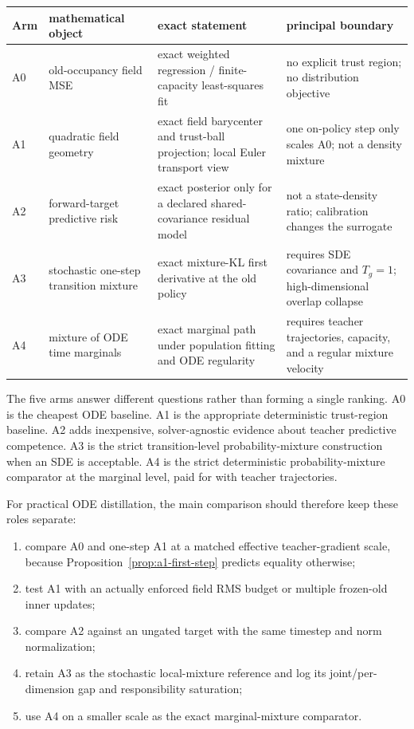 \documentclass[11pt,a4paper]{article}
\theoremstyle{plain}
\theoremstyle{definition}
\begin{document}
\begin{center}
\begin{tabular}{@{}
  >{\raggedright\arraybackslash}p{}
  >{\raggedright\arraybackslash}p{}
  >{\raggedright\arraybackslash}p{}
  >{\raggedright\arraybackslash}p{}
@{}}
\toprule
Arm & mathematical object & exact statement & principal boundary\\
\midrule
A0 & old-occupancy field MSE
& exact weighted regression / finite-capacity least-squares fit
& no explicit trust region; no distribution objective\\
\addlinespace
A1 & quadratic field geometry
& exact field barycenter and trust-ball projection; local Euler transport view
& one on-policy step only scales A0; not a density mixture\\
\addlinespace
A2 & forward-target predictive risk
& exact posterior only for a declared shared-covariance residual model
& not a state-density ratio; calibration changes the surrogate\\
\addlinespace
A3 & stochastic one-step transition mixture
& exact mixture-KL first derivative at the old policy
& requires SDE covariance and $T_g=1$; high-dimensional overlap collapse\\
\addlinespace
A4 & mixture of ODE time marginals
& exact marginal path under population fitting and ODE regularity
& requires teacher trajectories, capacity, and a regular mixture velocity\\
\bottomrule
\end{tabular}
\end{center}

The five arms answer different questions rather than forming a single ranking.  A0 is the cheapest
ODE baseline.  A1 is the appropriate deterministic trust-region baseline.  A2 adds inexpensive,
solver-agnostic evidence about teacher predictive competence.  A3 is the strict transition-level
probability-mixture construction when an SDE is acceptable.  A4 is the strict deterministic
probability-mixture comparator at the marginal level, paid for with teacher trajectories.

For practical ODE distillation, the main comparison should therefore keep these roles separate:
\begin{enumerate}[leftmargin=1.6em]
\item compare A0 and one-step A1 at a matched effective teacher-gradient scale, because
      Proposition~\ref{prop:a1-first-step} predicts equality otherwise;
\item test A1 with an actually enforced field RMS budget or multiple frozen-old inner updates;
\item compare A2 against an ungated target with the same timestep and norm normalization;
\item retain A3 as the stochastic local-mixture reference and log its joint/per-dimension gap and
      responsibility saturation;
\item use A4 on a smaller scale as the exact marginal-mixture comparator.
\end{enumerate}
\end{document}
